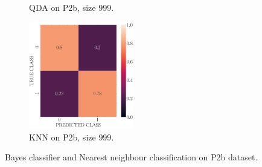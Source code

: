 \documentclass[11pt, a4 paper]{article}
\begin{document}
\begin{figure}[!htbp]
\begin{subfigure}[!htbp]{0.24\textwidth}
       \caption{QDA on P2b, size $999$.}
       \label{fig:QDA_rr20_P2b_999}
    \end{subfigure}
\quad    
    \begin{subfigure}[!htbp]{0.24\textwidth}
       \centering
       \includegraphics[width=1.8in]{../results/ex2/conf_mtx_KNN_dataset_P2b_size_999.pdf}
       \caption{KNN on P2b, size $999$.}
       \label{fig:KNN_rr20_P2b_999}
    \end{subfigure}
\caption{Bayes classifier and Nearest neighbour classification on P2b dataset.}
\label{fig:ex2P2b}
\end{figure}
\end{document}
